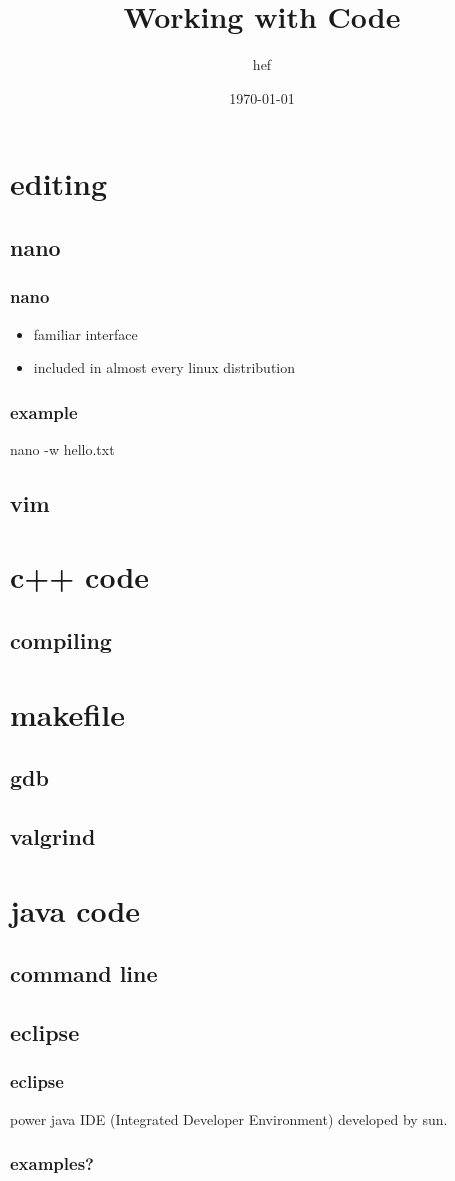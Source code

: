 \documentclass[hyperref={pdfpagelabels=false}]{beamer}
\title{Working with Code}
\author{hef}
\date{\today}
\begin{document}
\frame{\titlepage}
\section[outline]{}
\frame{\tableofcontents}
\section{editing}
\subsection{nano}
\frame
{
    \frametitle{nano}
    \begin{itemize}
    \item{familiar interface}
    \item{included in almost every linux distribution}
    \end{itemize}

    
}
\frame
{
    \frametitle{example}
    nano -w hello.txt


}
\subsection{vim}

\section{c++ code}
\subsection{compiling}
\section{makefile}
\subsection{gdb}
\subsection{valgrind}
\section{java code}
\subsection{command line}
\subsection{eclipse}
\frame
{
    \frametitle{eclipse}
    power java IDE (Integrated Developer Environment) developed by sun.
}
\frame
{
    \frametitle{examples?}
    {

    }
}
\end{document}
